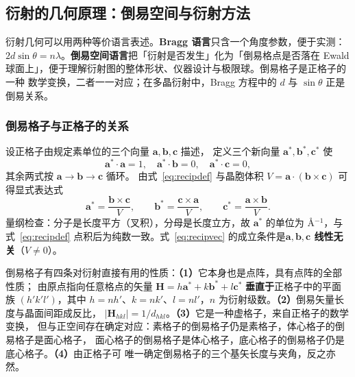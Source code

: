 \subsection{衍射的几何原理：倒易空间与衍射方法}

\begin{principle}
衍射几何可以用两种等价语言表述。\textbf{Bragg 语言}只含一个角度参数，便于实测：
$2d\sin\theta=n\lambda$。\textbf{倒易空间语言}把「衍射是否发生」化为「倒易格点是否落在
Ewald 球面上」，便于理解衍射图的整体形状、仪器设计与极限球。倒易格子是正格子的一种
数学变换，二者一一对应；在多晶衍射中，Bragg 方程中的 $d$ 与 $\sin\theta$ 正是倒易关系。
\end{principle}

\subsubsection{倒易格子与正格子的关系}

设正格子由规定素单位的三个向量 $\boldsymbol{a},\boldsymbol{b},\boldsymbol{c}$ 描述，
定义三个新向量 $\boldsymbol{a}^{*},\boldsymbol{b}^{*},\boldsymbol{c}^{*}$ 使
\begin{equation}
\boldsymbol{a}^{*}\cdot\boldsymbol{a}=1,\quad
\boldsymbol{a}^{*}\cdot\boldsymbol{b}=0,\quad
\boldsymbol{a}^{*}\cdot\boldsymbol{c}=0,
\label{eq:recipdef}
\end{equation}
其余两式按 $\boldsymbol{a}\rightarrow\boldsymbol{b}\rightarrow\boldsymbol{c}$ 循环。
由式~\eqref{eq:recipdef} 与晶胞体积 $V=\boldsymbol{a}\cdot(\boldsymbol{b}\times
\boldsymbol{c})$ 可得显式表达式
\begin{equation}
\boldsymbol{a}^{*}=\frac{\boldsymbol{b}\times\boldsymbol{c}}{V},\qquad
\boldsymbol{b}^{*}=\frac{\boldsymbol{c}\times\boldsymbol{a}}{V},\qquad
\boldsymbol{c}^{*}=\frac{\boldsymbol{a}\times\boldsymbol{b}}{V}.
\label{eq:recipvec}
\end{equation}
量纲检查：分子是长度平方（叉积），分母是长度立方，故 $\boldsymbol{a}^{*}$ 的单位为
$\unit{\angstrom^{-1}}$，与式~\eqref{eq:recipdef} 点积后为纯数一致。式~\eqref{eq:recipvec}
的成立条件是\textbf{$\boldsymbol{a},\boldsymbol{b},\boldsymbol{c}$ 线性无关}（$V\neq0$）。

倒易格子有四条对衍射直接有用的性质：\textbf{（1）}它本身也是点阵，具有点阵的全部性质；
由原点指向任意格点的矢量 $\boldsymbol{H}=h\boldsymbol{a}^{*}+k\boldsymbol{b}^{*}
+l\boldsymbol{c}^{*}$ \textbf{垂直于}正格子中的平面族 $(h'k'l')$，其中
$h=nh'$、$k=nk'$、$l=nl'$，$n$ 为衍射级数。\textbf{（2）}倒易矢量长度与晶面间距成反比，
$|\boldsymbol{H}_{hkl}|=1/d_{hkl}$。\textbf{（3）}它是一种虚格子，来自正格子的数学变换，
但与正空间存在确定对应：素格子的倒易格子仍是素格子，体心格子的倒易格子是面心格子，
面心格子的倒易格子是体心格子，底心格子的倒易格子仍是底心格子。\textbf{（4）}由正格子可
唯一确定倒易格子的三个基矢长度与夹角，反之亦然。

